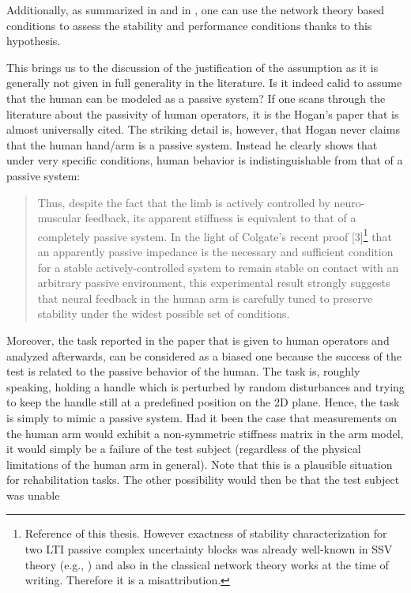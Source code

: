 Additionally, as summarized in  and in , one can use the 
network theory based conditions to assess the stability and performance conditions thanks to this hypothesis.

This brings us to the discussion of the justification of the assumption as it is generally not given in full generality in the
literature. Is it indeed calid to assume that the human can be modeled as a passive system? If one scans through the literature 
about the passivity of human operators, it is the Hogan's paper \cite{hogan89}
that is almost universally cited. The striking detail is, however, that Hogan never claims that the human hand/arm is a passive
system. Instead he clearly shows that under very specific conditions, human behavior is indistinguishable from that of a 
passive system: 
\begin{quote}
Thus, despite the fact that the
limb is actively controlled by neuro-muscular feedback, its apparent stiffness is equivalent to that of a completely passive
system. In the light of Colgate's recent proof [3]\footnote{Reference \cite{colgatehogan88} of this thesis. However exactness 
of stability characterization for two LTI passive complex uncertainty blocks was already well-known in SSV theory (e.g., \cite{packdoyle}) 
and also in the classical network theory works at the time of writing. Therefore it is a misattribution.} that an apparently 
passive impedance is the necessary and sufficient condition for a stable actively-controlled system to remain stable on contact 
with an arbitrary passive environment, this experimental result strongly suggests that neural feedback in the human arm is carefully 
tuned to preserve stability under the widest possible set of conditions.
\end{quote}
Moreover, the task reported in the paper that is given to human operators and analyzed afterwards, can be considered as a biased one because the success 
of the test is related to the passive behavior of the human. The task is, roughly speaking, holding a handle which is perturbed by 
random disturbances and trying to keep the handle still at a predefined position on the 2D plane. Hence, the task is simply to mimic 
a passive system. Had it been the case that measurements on the human arm would exhibit a non-symmetric stiffness matrix in the arm 
model, it would simply be a failure of the test subject (regardless of the physical limitations of the human arm in general). Note 
that this is a plausible situation for rehabilitation tasks. The other possibility would then be that the test subject was unable 
